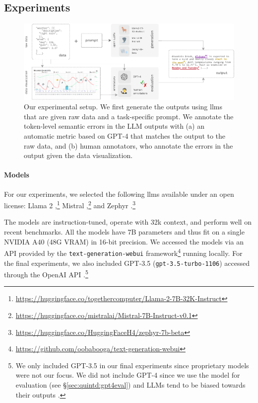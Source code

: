 \subsection{Experiments}
\label{sec:quintd:experiments}

\begin{figure}[t]
    \centering
    \includegraphics[width=\textwidth]{img/quintd_process.pdf}
    \caption[Our experimental setup for data-to-text with large language models.]{Our experimental setup. We first generate the outputs using \acp{llm} that are given raw data and a task-specific prompt. We annotate the token-level semantic errors in the LLM outputs with (a) an automatic metric based on GPT-4 that matches the output to the raw data, and (b) human annotators, who annotate the errors in the output given the data visualization.}\label{fig:quintd:process}
\end{figure}

\paragraph{Models}
\label{sec:quintd:models}
For our experiments, we selected the following \acp{llm} available under an open license: Llama 2 \cite{touvronLlamaOpenFoundation2023,llama-2-7b-32k},\footnote{\url{https://huggingface.co/togethercomputer/Llama-2-7B-32K-Instruct}} Mistral \cite{jiangMistral7B2023},\footnote{\url{https://huggingface.co/mistralai/Mistral-7B-Instruct-v0.1}} and Zephyr \cite{tunstallZephyrDirectDistillation2023}.\footnote{\url{https://huggingface.co/HuggingFaceH4/zephyr-7b-beta}}

The models are instruction-tuned, operate with 32k context, and perform well on recent benchmarks. All the models have 7B parameters and thus fit on a single NVIDIA A40 (48G VRAM) in 16-bit precision. We accessed the models via an API provided by the \texttt{text-generation-webui} framework\footnote{\url{https://github.com/oobabooga/text-generation-webui}} running locally.
For the final experiments, we also included GPT-3.5 (\texttt{gpt-3.5-turbo-1106}) accessed through the OpenAI API \cite{chatgpt}.\footnote{We only included GPT-3.5 in our final experiments since proprietary models were not our focus. We did not include GPT-4 since we use the model for evaluation (see §\ref{sec:quintd:gpt4eval}) and LLMs tend to be biased towards their outputs \cite{kooBenchmarkingCognitiveBiases2023,stureborgLargeLanguageModels2024}.}

